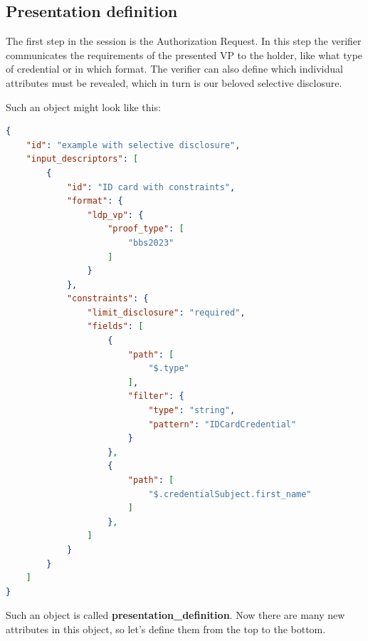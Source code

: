 \documentclass[
	a4paper               %
	,BCOR=0mm            %
	,bibliography=totoc   %
	,listof=totoc         %
	,monolingual
	,twoside=false
]{bfhthesis}              %
\begin{document}
\subsection{Presentation definition}
\label{subsec:presdef}
The first step in the session is the Authorization Request. 
In this step the verifier communicates the requirements of the presented VP to the holder, like what type of credential or in which format.
The verifier can also define which individual attributes must be revealed, which in turn is our beloved selective disclosure.

Such an object might look like this:
\begin{lstlisting}[language=json,firstnumber=1,caption={Example of a presentation definition},captionpos=b, label={list:presdef}]
{
	"id": "example with selective disclosure",
	"input_descriptors": [
		{
			"id": "ID card with constraints",
			"format": {
				"ldp_vp": {
					"proof_type": [
						"bbs2023"
					]
				}
			},
			"constraints": {
				"limit_disclosure": "required",
				"fields": [
					{
						"path": [
							"$.type"
						],
						"filter": {
							"type": "string",
							"pattern": "IDCardCredential"
						}
					},
					{
						"path": [
							"$.credentialSubject.first_name"
						]
					},
				]
			}
		}
	]
}
\end{lstlisting}

Such an object is called \textbf{presentation\_definition}.
Now there are many new attributes in this object, so let's define them from the top to the bottom. \\
\end{document}
